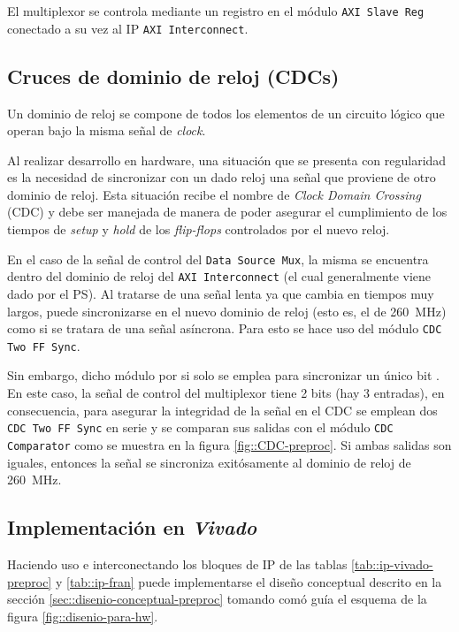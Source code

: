 \documentclass[../../main.tex]{subfiles}
\begin{document}
El multiplexor se controla mediante un registro en el módulo \texttt{AXI Slave Reg} conectado a su vez al IP \texttt{AXI Interconnect}.

\subsection{Cruces de dominio de reloj (CDCs)}\label{subsec::cdcs-standalone}
Un dominio de reloj se compone de todos los elementos de un circuito lógico que operan bajo la misma señal de \textit{clock}.

Al realizar desarrollo en hardware, una situación que se presenta con regularidad es la necesidad de sincronizar con un dado reloj una señal que proviene de otro dominio de reloj. Esta situación recibe el nombre de \textit{Clock Domain Crossing} (CDC) y debe ser manejada de manera de poder asegurar el cumplimiento de los tiempos de \textit{setup} y \textit{hold} de los \textit{flip-flops} controlados por el nuevo reloj.

En el caso de la señal de control del \texttt{Data Source Mux}, la misma se encuentra dentro del dominio de reloj del \texttt{AXI Interconnect} (el cual generalmente viene dado por el PS). Al tratarse de una señal lenta ya que cambia en tiempos muy largos, puede sincronizarse en el nuevo dominio de reloj (esto es, el de 260~MHz) como si se tratara de una señal asíncrona. Para esto se hace uso del módulo \texttt{CDC Two FF Sync}.

Sin embargo, dicho módulo por si solo se emplea para sincronizar un único bit . En este caso, la señal de control del multiplexor tiene 2 bits (hay 3 entradas), en consecuencia, para asegurar la integridad de la señal en el CDC se emplean dos \texttt{CDC Two FF Sync} en serie y se comparan sus salidas con el módulo \texttt{CDC Comparator} como se muestra en la figura \ref{fig::CDC-preproc}. Si ambas salidas son iguales, entonces la señal se sincroniza exitósamente al dominio de reloj de 260~MHz.


\subsection{Implementación en \textit{Vivado}}\label{subsec::implementacion-vivado}
Haciendo uso e interconectando los bloques de IP de las tablas \ref{tab::ip-vivado-preproc} y \ref{tab::ip-fran} puede implementarse el diseño conceptual descrito en la sección \ref{sec::disenio-conceptual-preproc} tomando comó guía el esquema de la figura \ref{fig::disenio-para-hw}. 
\end{document}
